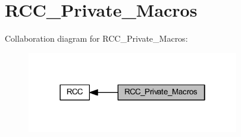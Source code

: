 \hypertarget{group___r_c_c___private___macros}{}\section{R\+C\+C\+\_\+\+Private\+\_\+\+Macros}
\label{group___r_c_c___private___macros}
Collaboration diagram for R\+C\+C\+\_\+\+Private\+\_\+\+Macros\+:
\nopagebreak
\begin{figure}[H]
\begin{center}
\leavevmode
\includegraphics[width=262pt]{group___r_c_c___private___macros}
\end{center}
\end{figure}
